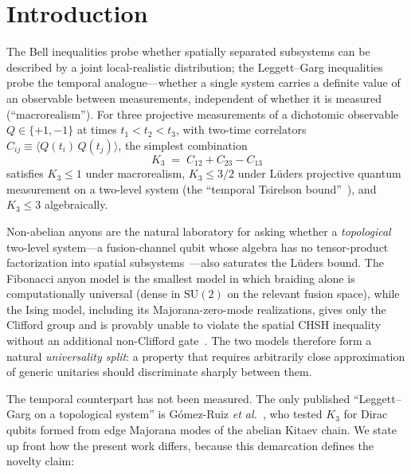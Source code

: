 \documentclass[aps,prx,reprint,amsmath,amssymb,floatfix,nofootinbib,superscriptaddress]{revtex4-2}
\begin{document}
\maketitle

\section{Introduction}

The Bell inequalities probe whether spatially separated subsystems can
be described by a joint local-realistic distribution; the
Leggett--Garg inequalities~\cite{LeggettGarg1985} probe the temporal
analogue---whether a single system carries a definite value of an
observable between measurements, independent of whether it is measured
(``macrorealism''). For three projective measurements of a dichotomic
observable $Q \in \{+1,-1\}$ at times $t_{1} < t_{2} < t_{3}$, with
two-time correlators $C_{ij} \equiv \langle Q(t_{i})\,Q(t_{j}) \rangle$,
the simplest combination
\begin{equation}
  K_{3} \;=\; C_{12} + C_{23} - C_{13}
\end{equation}
satisfies $K_{3} \leq 1$ under macrorealism, $K_{3} \leq 3/2$ under
L\"uders projective quantum measurement on a two-level system (the
``temporal Tsirelson bound''~\cite{Budroni2014}), and $K_{3} \leq 3$
algebraically.

Non-abelian anyons are the natural laboratory for asking whether a
\emph{topological} two-level system---a fusion-channel qubit whose
algebra has no tensor-product factorization into spatial
subsystems~\cite{NayakSimonStern2008}---also saturates the L\"uders
bound. The Fibonacci anyon model is the smallest model in which
braiding alone is computationally universal (dense in $\mathrm{SU}(2)$
on the relevant fusion space), while the Ising model, including its
Majorana-zero-mode realizations, gives only the Clifford group and is
provably unable to violate the spatial CHSH inequality without an
additional non-Clifford gate~\cite{HouShtengel2016}. The two models
therefore form a natural \emph{universality split}: a property that
requires arbitrarily close approximation of generic unitaries should
discriminate sharply between them.

The temporal counterpart has not been measured. The only published
``Leggett--Garg on a topological system'' is G\'omez-Ruiz
\emph{et al.}~\cite{GomezRuiz2018}, who tested $K_{3}$ for Dirac
qubits formed from edge Majorana modes of the abelian Kitaev chain.
We state up front how the present work differs, because this
demarcation defines the novelty claim:
\end{document}
